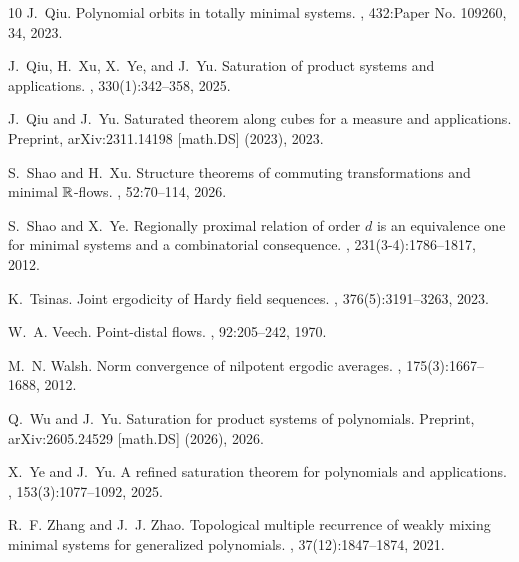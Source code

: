 \documentclass[11pt,reqno]{amsart}
\theoremstyle{definition}
\theoremstyle{remark}
\begin{document}
\begin{thebibliography}{10}
J.~Qiu.
\newblock Polynomial orbits in totally minimal systems.
, 432:Paper No. 109260, 34, 2023.

J.~Qiu, H.~Xu, X.~Ye, and J.~Yu.
\newblock Saturation of product systems and applications.
, 330(1):342--358, 2025.

J.~Qiu and J.~Yu.
\newblock Saturated theorem along cubes for a measure and applications.
\newblock Preprint, {arXiv}:2311.14198 [math.{DS}] (2023), 2023.

S.~Shao and H.~Xu.
\newblock Structure theorems of commuting transformations and minimal {$\Bbb{R} $}-flows.
, 52:70--114, 2026.

S.~Shao and X.~Ye.
\newblock Regionally proximal relation of order {$d$} is an equivalence one for minimal systems and a combinatorial consequence.
, 231(3-4):1786--1817, 2012.

K.~Tsinas.
\newblock Joint ergodicity of {H}ardy field sequences.
, 376(5):3191--3263, 2023.

W.~A. Veech.
\newblock Point-distal flows.
, 92:205--242, 1970.

M.~N. Walsh.
\newblock Norm convergence of nilpotent ergodic averages.
, 175(3):1667--1688, 2012.

Q.~Wu and J.~Yu.
\newblock Saturation for product systems of polynomials.
\newblock Preprint, {arXiv}:2605.24529 [math.{DS}] (2026), 2026.

X.~Ye and J.~Yu.
\newblock A refined saturation theorem for polynomials and applications.
, 153(3):1077--1092, 2025.

R.~F. Zhang and J.~J. Zhao.
\newblock Topological multiple recurrence of weakly mixing minimal systems for generalized polynomials.
, 37(12):1847--1874, 2021.

\end{thebibliography}
\end{document}
